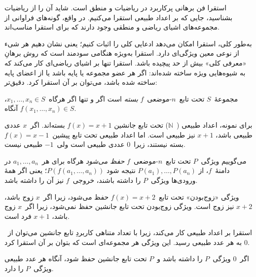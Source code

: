 \documentclass[../../../include/open-logic-section]{subfiles}
\begin{document}


\begin{explain}
استقرا فن برهانی پرکاربرد در ریاضیات و منطق است. شاید آن را از ریاضیات
بشناسید، جایی که بر اعداد طبیعی استقرا می‌کنیم. در واقع، گونه‌های فراوانی
از مجموعه‌های اشیای ریاضی و منطقی وجود دارند که برای استقرا مناسب‌اند.

به‌طور کلی، استقرا امکان می‌دهد ادعایی کلی را اثبات کنیم؛ یعنی نشان دهیم
هر شیء از نوعی معین ویژگی‌ای دارد. استقرا به‌ویژه هنگامی سودمند است که
روش برهانِ «معرفی کلی» بیش از حد پیچیده باشد. استقرا تنها بر اشیای ریاضی‌ای
کار می‌کند که به شیوه‌هایی ویژه ساخته شده‌اند: اگر هر عضو مجموعه یا پایه
باشد یا از اعضای پایه ساخته شده باشد، می‌توان بر آن استقرا کرد. دقیق‌تر:
\end{explain}

\begin{defn}
مجموعهٔ~$S$ تحت تابع~$n$-موضعی~$f$ \emph{بسته} است اگر و تنها اگر
هرگاه~$x_1,\dots,x_n\in S$، آنگاه
$f(x_1,\dots,x_n)\in S$.
\end{defn}

\begin{explain}
برای نمونه، اعداد طبیعی (~$\mathbb{N}$) تحت تابع جانشین
$f(x) = x+1$ بسته‌اند. اگر~$x$ عددی طبیعی باشد، $x+1$ نیز طبیعی است.
اما اعداد طبیعی تحت تابع پیشین~$f(x) = x-1$ بسته نیستند، زیرا~$0$ عددی
طبیعی است ولی~$-1$ طبیعی نیست.
\end{explain}

\begin{defn}
می‌گوییم ویژگی~$P$ تحت تابع~$n$-موضعی~$f$ \emph{حفظ می‌شود} هرگاه برای
هر~$a_1,\dots,a_n$ در دامنهٔ~$f$، از
$P(a_1),\dots,P(a_n)$ نتیجه شود
$P(f(a_1,\dots,a_n))$؛ یعنی اگر همهٔ ورودی‌ها ویژگی~$P$ را داشته باشند،
خروجی~$f$ نیز آن را داشته باشد.
\end{defn}

\begin{explain}
ویژگی «زوج‌بودن» تحت تابع~$f(x) = x+2$ حفظ می‌شود، زیرا اگر~$x$ زوج
باشد، $x+2$ نیز زوج است. ویژگی زوج‌بودن تحت تابع جانشین حفظ نمی‌شود،
زیرا اگر~$x$ زوج باشد، $x+1$ فرد است.

استقرا بر اعداد طبیعی کار می‌کند، زیرا با تعداد متناهی کاربردِ تابع جانشین
می‌توان از~$0$ به هر عدد طبیعی رسید. این ویژگی هر مجموعه‌ای است که بتوان
بر آن استقرا کرد.
\end{explain}

\begin{defn}
اگر~$0$ ویژگی~$P$ را داشته باشد و~$P$ تحت تابع جانشین حفظ شود، آنگاه
هر عدد طبیعی ویژگی~$P$ را دارد.
\end{defn}
\end{document}
